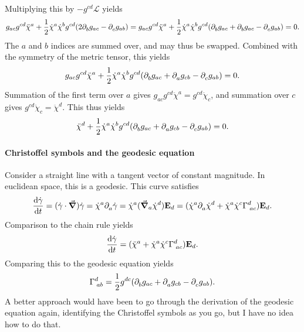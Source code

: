 Multiplying this by $-g^{cd}\mathcal{L}$ yields
\begin{align*}
	g_{ac}g^{cd}\ddot{\chi}^{a} + \frac{1}{2}\dot{\chi}^{a}\dot{\chi}^{b}g^{cd}(2\partial^{}_{b}g_{ac} - \partial^{}_{c}g_{ab}) = g_{ac}g^{cd}\ddot{\chi}^{a} + \frac{1}{2}\dot{\chi}^{a}\dot{\chi}^{b}g^{cd}(\partial^{}_{b}g_{ac} + \partial^{}_{b}g_{ac} - \partial^{}_{c}g_{ab}) = 0.
\end{align*}
The $a$ and $b$ indices are summed over, and may thus be swapped. Combined with the symmetry of the metric tensor, this yields
\begin{align*}
	g_{ac}g^{cd}\ddot{\chi}^{a} + \frac{1}{2}\dot{\chi}^{a}\dot{\chi}^{b}g^{cd}(\partial^{}_{b}g_{ac} + \partial^{}_{a}g_{cb} - \partial^{}_{c}g_{ab}) = 0.
\end{align*}
Summation of the first term over $a$ gives $g_{ac}g^{cd}\ddot{\chi}^{a} = g^{cd}\ddot{\chi}_{c}$, and summation over $c$ gives $g^{cd}\ddot{\chi}_{c} = \ddot{\chi}^{d}$. This thus yields
\begin{align*}
	\ddot{\chi}^{d} + \frac{1}{2}\dot{\chi}^{a}\dot{\chi}^{b}g^{cd}(\partial^{}_{b}g_{ac} + \partial^{}_{a}g_{cb} - \partial^{}_{c}g_{ab}) = 0.
\end{align*}

\paragraph{Christoffel symbols and the geodesic equation}
Consider a straight line with a tangent vector of constant magnitude. In euclidean space, this is a geodesic. This curve satisfies
\begin{align*}
	\dv{\dot{\vb{\gamma}}}{t} = (\dot{\vb{\gamma}}\cdot\grad)\dot{\vb{\gamma}} = \dot{\chi}^{a}\partial^{}_{a}\dot{\vb{\gamma}} = \dot{\chi}^{a}(\grad_{a}{\dot{\chi}^{d}})\vb{E}_{d} = (\dot{\chi}^{a}\partial^{}_{a}\dot{\chi}^{d} + \dot{\chi}^{a}\dot{\chi}^{c}\Gamma^{d}_{\;ac})\vb{E}_{d}.
\end{align*}
Comparison to the chain rule yields
\begin{align*}
	\dv{\dot{\vb{\gamma}}}{t} = (\ddot{\chi}^{a} + \dot{\chi}^{a}\dot{\chi}^{c}\Gamma^{d}_{\;ac})\vb{E}_{d}.
\end{align*}
Comparing this to the geodesic equation yields
\begin{align*}
	\Gamma^{d}_{\;ab} = \frac{1}{2}g^{dc}(\partial^{}_{b}g_{ac} + \partial^{}_{a}g_{cb} - \partial^{}_{c}g_{ab}).
\end{align*}
A better approach would have been to go through the derivation of the geodesic equation again, identifying the Christoffel symbols as you go, but I have no idea how to do that.

